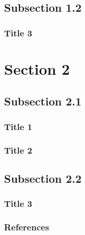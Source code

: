 \documentclass[aspectratio=169]{beamer}
\begin{document}
  \subsection{Subsection 1.2}
  \begin{frame}[plain]
    \frametitle{Title 3} 
    \lipsum[3]
  \end{frame}

\section{Section 2}
  \subsection{Subsection 2.1}
  \begin{frame}
    \frametitle{Title 1} 
    \lipsum[4]
  \end{frame}

  \begin{frame}
    \frametitle{Title 2} 
    \lipsum[5]
  \end{frame}

  \subsection{Subsection 2.2}
  \begin{frame}[plain]
    \frametitle{Title 3} 
    \lipsum[6]
  \end{frame}

  \begin{frame}
    \frametitle{References}
    \printbibliography[heading=none]
  \end{frame}
\end{document}
